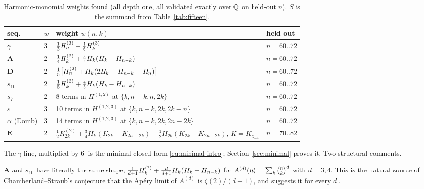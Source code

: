 \begin{table}[ht]
\centering\footnotesize
\caption{Harmonic-monomial weights found (all depth one, all validated exactly over $\mathbb{Q}$
on held-out $n$). $S$ is the summand from Table~\ref{tab:fifteen}.}
\label{tab:decomp}
\begin{tabular}{@{}llll@{}}
\toprule
seq. & $w$ & weight $w(n,k)$ & held out\\
\midrule
$\gamma$ & 3 & $\frac13H^{(3)}_{n}-\frac16H^{(3)}_{k}$ & $n=60..72$\\
$\mathbf A$ & 2 & $\frac14H^{(2)}_{k}+\frac34H_k(H_k-H_{n-k})$ & $n=60..72$\\
$\mathbf D$ & 2 & $\frac15\bigl[H^{(2)}_{n}+H_k(2H_k-H_{n-k}-H_n)\bigr]$ & $n=60..72$\\
$s_{10}$ & 2 & $\frac15H^{(2)}_{k}+\frac45H_k(H_k-H_{n-k})$ & $n=60..72$\\
$s_7$ & 2 & 8 terms in $H^{(1,2)}$ at $\{k,n-k,n,2k\}$ & $n=60..72$\\
$\varepsilon$ & 3 & 10 terms in $H^{(1,2,3)}$ at $\{k,n-k,2k,2k-n\}$ & $n=60..72$\\
$\alpha$ (Domb) & 3 & 14 terms in $H^{(1,2,3)}$ at $\{k,n-k,2k,2n-2k\}$ & $n=60..72$\\
$\mathbf E$ & 2 & $\frac12K^{(2)}_{2k}+\frac34H_k(K_{2k}-K_{2n-2k})-\frac12H_{2k}(K_{2k}-K_{2n-2k})$, $K=K_{\chi_{-4}}$ & $n=70..82$\\
\bottomrule
\end{tabular}
\end{table}

The $\gamma$ line, multiplied by $6$, is the minimal closed form
\eqref{eq:minimal-intro}; Section~\ref{sec:minimal} proves it. Two structural comments.

\begin{remark}\label{rem:samefamily}
$\mathbf A$ and $s_{10}$ have literally the same shape,
$\frac1{d+1}H^{(2)}_{k}+\frac d{d+1}H_k(H_k-H_{n-k})$ for $A^{(d)}(n)=\sum_k\binom{n}{k}^d$ with
$d=3,4$. This is the natural source of Chamberland--Straub's conjecture
\cite[eq.~(7.4)]{ChamStraub} that the Ap\'ery limit of $A^{(d)}$ is $\zeta(2)/(d+1)$, and
suggests it for every $d$ .
\end{remark}

